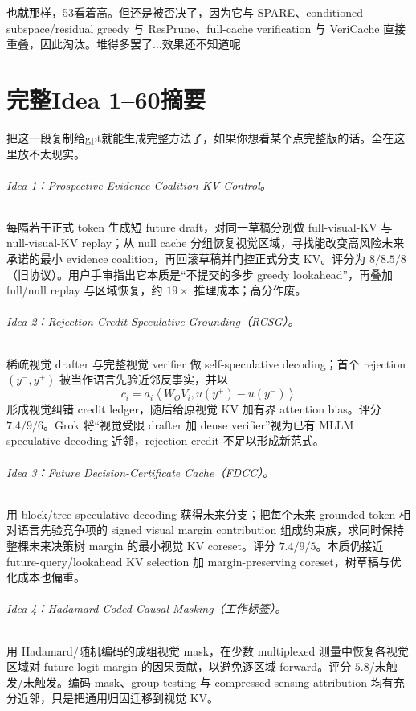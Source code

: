 \documentclass[UTF8,zihao=-4,a4paper]{ctexart}
\begin{document}
也就那样，53看着高。但还是被否决了，因为它与 SPARE、conditioned subspace/residual greedy 与 ResPrune、full-cache verification 与 VeriCache 直接重叠，因此淘汰。堆得多罢了...效果还不知道呢

\clearpage
\part{完整Idea 1--60摘要}

把这一段复制给gpt就能生成完整方法了，如果你想看某个点完整版的话。全在这里放不太现实。

\paragraph{Idea 1：Prospective Evidence Coalition KV Control。}
每隔若干正式 token 生成短 future draft，对同一草稿分别做 full-visual-KV 与 null-visual-KV replay；从 null cache 分组恢复视觉区域，寻找能改变高风险未来承诺的最小 evidence coalition，再回滚草稿并门控正式分支 KV。评分为 $8/8.5/8$（旧协议）。用户手审指出它本质是“不提交的多步 greedy lookahead”，再叠加 full/null replay 与区域恢复，约 $19\times$ 推理成本；高分作废。

\paragraph{Idea 2：Rejection-Credit Speculative Grounding（RCSG）。}
稀疏视觉 drafter 与完整视觉 verifier 做 self-speculative decoding；首个 rejection $(y^-,y^+)$ 被当作语言先验近邻反事实，并以
\[
c_i=a_i\left\langle W_OV_i,u(y^+)-u(y^-)\right\rangle
\]
形成视觉纠错 credit ledger，随后给原视觉 KV 加有界 attention bias。评分 $7.4/9/6$。Grok 将“视觉受限 drafter 加 dense verifier”视为已有 MLLM speculative decoding 近邻，rejection credit 不足以形成新范式。

\paragraph{Idea 3：Future Decision-Certificate Cache（FDCC）。}
用 block/tree speculative decoding 获得未来分支；把每个未来 grounded token 相对语言先验竞争项的 signed visual margin contribution 组成约束族，求同时保持整棵未来决策树 margin 的最小视觉 KV coreset。评分 $7.4/9/5$。本质仍接近 future-query/lookahead KV selection 加 margin-preserving coreset，树草稿与优化成本也偏重。

\paragraph{Idea 4：Hadamard-Coded Causal Masking（工作标签）。}
用 Hadamard/随机编码的成组视觉 mask，在少数 multiplexed 测量中恢复各视觉区域对 future logit margin 的因果贡献，以避免逐区域 forward。评分 $5.8$/未触发/未触发。编码 mask、group testing 与 compressed-sensing attribution 均有充分近邻，只是把通用归因迁移到视觉 KV。
\end{document}
